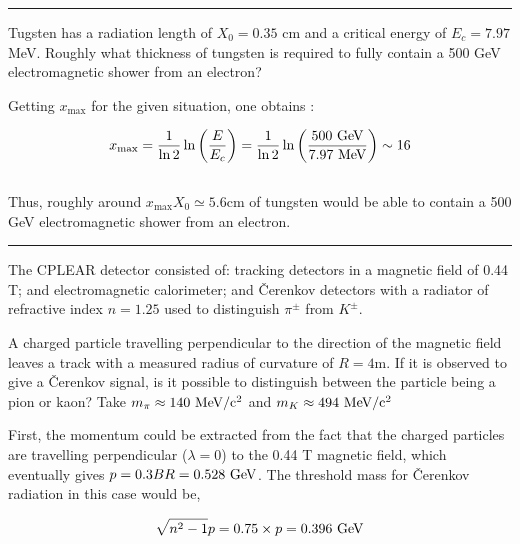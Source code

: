 \noindent\rule{7in}{1.5pt}


\begin{problem}{1.8}
Tugsten has a radiation length of $X_0=0.35$ cm and a critical energy of $E_c = 7.97$ MeV. Roughly what thickness of tungsten is required to fully contain a 500 GeV electromagnetic shower from an electron?
\end{problem}
\begin{solution}
Getting $x_\text{max}$ for the given situation, one obtains :

\begin{align*}
    x_{\text{max}} = \frac{1}{\ln 2}\ln\left( \frac{E}{E_c}\right) = \frac{1}{\ln 2}\ln\left( \frac{500 \text{ GeV}}{7.97 \text{ MeV}}\right) \sim 16
\end{align*}\\
Thus, roughly around $x_\text{max}X_0 \simeq 5.6 \unit{\centi\metre}$ of tungsten would be able to contain a 500 GeV electromagnetic shower from an electron.\\
\end{solution} 
\noindent\rule{7in}{1.5pt}


\begin{problem}{1.9}
The CPLEAR detector consisted of: tracking detectors in a magnetic field of 0.44 T; and electromagnetic calorimeter;
and Čerenkov detectors with a radiator of refractive index $n=1.25$ used to distinguish $\pi^\pm$ from $K^\pm$.

A charged particle travelling perpendicular to the direction of the magnetic field leaves a track with a
measured radius of curvature of $R=4$m. If it is observed to give a Čerenkov signal, is it 
possible to distinguish between the particle being a pion or kaon? Take $m_\pi \approx 140 \text{ MeV} /\text{c}^2$ and $m_K \approx 494 \text{ MeV} /\text{c}^2$ 
\end{problem}
\begin{solution}
First, the momentum could be extracted from the fact that the charged particles are travelling perpendicular ($\lambda =0 $) to the 0.44 T magnetic field, 
which eventually gives $p=0.3BR=0.528\text{ GeV}$. The threshold mass for Čerenkov radiation in this case would be,

\begin{align*}
    \sqrt{n^2-1} p = 0.75 \times p = 0.396 \text{ GeV}
\end{align*}
\end{solution}

